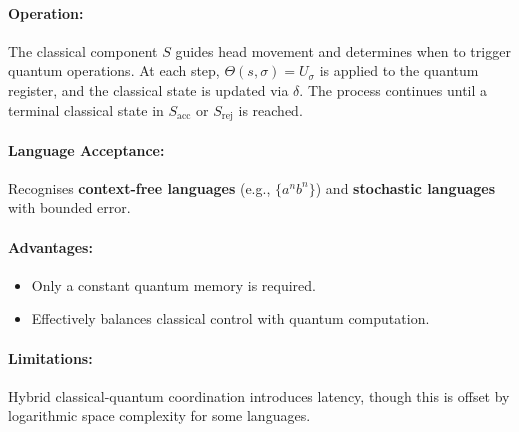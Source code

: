 \paragraph{Operation:}  
The classical component \( S \) guides head movement and determines when to trigger quantum operations. At each step, \( \Theta(s, \sigma) = U_\sigma \) is applied to the quantum register, and the classical state is updated via \( \delta \). The process continues until a terminal classical state in \( S_{\text{acc}} \) or \( S_{\text{rej}} \) is reached.

\paragraph{Language Acceptance:}  
Recognises \textbf{context-free languages} (e.g., \(\{a^n b^n\}\)) and \textbf{stochastic languages} with bounded error.

\paragraph{Advantages:}
\begin{itemize}
    \item Only a constant quantum memory is required.
    \item Effectively balances classical control with quantum computation.
\end{itemize}

\paragraph{Limitations:}
Hybrid classical-quantum coordination introduces latency, though this is offset by logarithmic space complexity for some languages.

